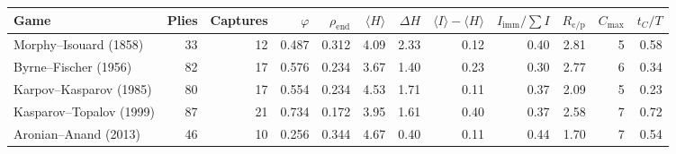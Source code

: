 \begin{tabular}{lrrrrrrrrrrr}
\toprule
Game & Plies & Captures & $\varphi$ & $\rho_{\mathrm{end}}$ & $\langle H\rangle$ & $\Delta H$ & $\langle I\rangle-\langle H\rangle$ & $I_{\mathrm{imm}}/\sum I$ & $R_{\mathrm{c/p}}$ & $C_{\max}$ & $t_{C}/T$ \\
\midrule
Morphy--Isouard (1858) & 33 & 12 & 0.487 & 0.312 & 4.09 & 2.33 & 0.12 & 0.40 & 2.81 & 5 & 0.58 \\
Byrne--Fischer (1956) & 82 & 17 & 0.576 & 0.234 & 3.67 & 1.40 & 0.23 & 0.30 & 2.77 & 6 & 0.34 \\
Karpov--Kasparov (1985) & 80 & 17 & 0.554 & 0.234 & 4.53 & 1.71 & 0.11 & 0.37 & 2.09 & 5 & 0.23 \\
Kasparov--Topalov (1999) & 87 & 21 & 0.734 & 0.172 & 3.95 & 1.61 & 0.40 & 0.37 & 2.58 & 7 & 0.72 \\
Aronian--Anand (2013) & 46 & 10 & 0.256 & 0.344 & 4.67 & 0.40 & 0.11 & 0.44 & 1.70 & 7 & 0.54 \\
\bottomrule
\end{tabular}
